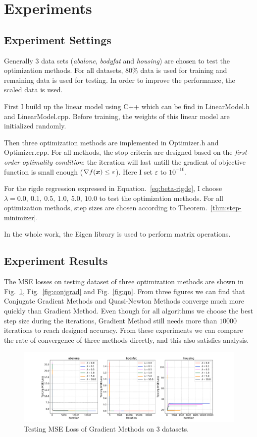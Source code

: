 \section{Experiments}

\subsection{Experiment Settings}
Generally \(3\) data sets (\emph{abalone}, \emph{bodyfat} and \emph{housing}) are 
chosen to test the optimization methods. For all datasets, \(80\%\) data is used for
training and remaining data is used for testing. In order to improve the performance,
the scaled data is used.

First I build up the linear model using C++ which can be find in LinearModel.h and 
LinearModel.cpp. Before training, the weights of this linear model are initialized
randomly.

Then three optimization methods are implemented in Optimizer.h and Optimizer.cpp.
For all methods, the stop criteria are designed based on the 
\emph{first-order optimality condition}: the iteration will last untill the gradient 
of objective function is small enough (\(\nabla f(\bm{x}) \le \varepsilon\)). Here I set
\(\varepsilon\) to \(10^{-10}\).

For the rigde regression expressed in Equation.~\ref{eq:beta-rigde}, I choose 
\(\lambda = 0.0, ~0.1, ~0.5, ~1.0, ~5.0, ~10.0\) to test the optimization methods.
For all optimization methods, step sizes are chosen according to Theorem.~\ref{thm:step-minimizer}.

In the whole work, the Eigen library is used to perform matrix operations.

\subsection{Experiment Results}
The MSE losses on testing dataset of three optimization methods are shown in Fig.~\ref{fig:grad}, Fig.~\ref{fig:conjgrad}
and Fig.~\ref{fig:qn}. From three figures we can find that Conjugate Gradient Methods and Quasi-Newton Methods 
converge much more quickly than Gradient Method. Even though for all algorithms we choose the best step size during the iterations,
Gradient Method still needs more than \(10000\) iterations to reach designed accuracy. From these experiments we can compare the rate
of convergence of three methods directly, and this also satisfies analysis.

\begin{figure}[!htbp]
    \centering
    \includegraphics[scale = 0.28]{fig/Grad.pdf}
    \caption{Testing MSE Loss of Gradient Methods on \(3\) datasets.}
    \label{fig:grad}
\end{figure}

